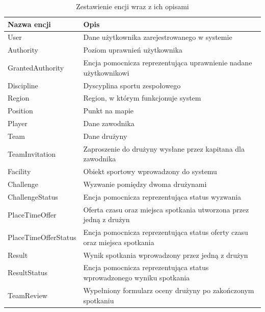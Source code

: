 \begin{table}[H]
\centering\small
\caption{Zestawienie encji wraz z ich opisami}
\label{tab:szablon}
\begin{tabularx}{\linewidth}{|p{.2\linewidth}|X|}\hline
Nazwa encji & Opis \\ \hline\hline

User & Dane użytkownika zarejestrowanego w systemie  \\ \hline
Authority & Poziom uprawnień użytkownika \\ \hline
GrantedAuthority & Encja pomocnicza reprezentująca uprawnienie nadane użytkownikowi \\ \hline
Discipline & Dyscyplina sportu zespołowego \\ \hline
Region & Region, w którym funkcjonuje system  \\ \hline
Position & Punkt na mapie \\ \hline
Player & Dane zawodnika\\ \hline
Team & Dane drużyny\\ \hline
TeamInvitation & Zaproszenie do drużyny wysłane przez kapitana dla zawodnika\\ \hline
Facility & Obiekt sportowy wprowadzony do systemu\\ \hline
Challenge & Wyzwanie pomiędzy dwoma drużynami\\ \hline
ChallengeStatus & Encja pomocnicza reprezentująca status wyzwania\\ \hline
PlaceTimeOffer & Oferta czasu oraz miejsca spotkania utworzona przez jedną z drużyn\\ \hline
PlaceTimeOfferStatus & Encja pomocnicza reprezentująca status oferty czasu oraz miejsca spotkania\\ \hline
Result & Wynik spotkania wprowadzony przez jedną z drużyn\\ \hline
ResultStatus & Encja pomocnicza reprezentująca status wprowadzonego wyniku spotkania\\ \hline
TeamReview & Wypełniony formularz oceny drużyny po zakończonym spotkaniu\\ \hline

\end{tabularx}
\end{table}

